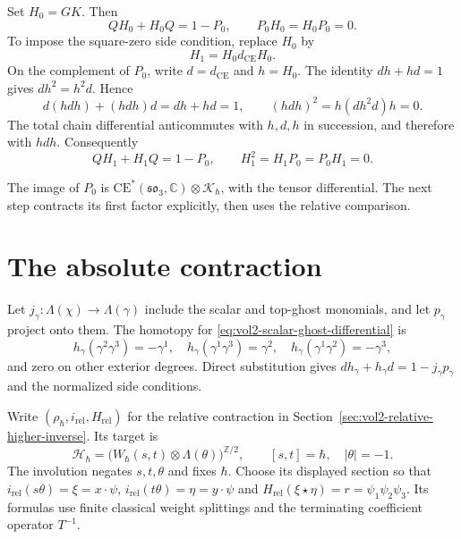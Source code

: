 Set $H_0=GK$. Then
\[
 QH_0+H_0Q=1-P_0,\qquad
 P_0H_0=H_0P_0=0.
\]
To impose the square-zero side condition, replace $H_0$ by
\begin{equation}\label{eq:vol2-absolute-normalized-casimir}
 H_1=H_0d_{\mathrm{CE}}H_0.
\end{equation}
On the complement of $P_0$, write $d=d_{\mathrm{CE}}$ and
$h=H_0$. The identity $dh+hd=1$ gives
$dh^2=h^2d$. Hence
\[
 d(hdh)+(hdh)d=dh+hd=1,
 \qquad (hdh)^2=h(dh^2d)h=0.
\]
The total chain differential anticommutes with $h,d,h$ in
succession, and therefore with $hdh$.
Consequently
\begin{equation}\label{eq:vol2-absolute-first-contraction}
 QH_1+H_1Q=1-P_0,
 \qquad H_1^2=H_1P_0=P_0H_1=0.
\end{equation}

The image of $P_0$ is
$\mathrm{CE}^*(\mathfrak{so}_3,\mathbb C)
 \otimes\mathcal K_\hbar$,
with the tensor differential. The next step contracts its
first factor explicitly, then uses the relative comparison.

\section{The absolute contraction}
\label{sec:vol2-absolute-contraction}

Let $j_\gamma:\Lambda(\chi)\to\Lambda(\gamma)$ include
the scalar and top-ghost monomials, and let $p_\gamma$ project
onto them. The homotopy for
\eqref{eq:vol2-scalar-ghost-differential} is
\begin{equation}\label{eq:vol2-absolute-scalar-homotopy}
 h_\gamma(\gamma^2\gamma^3)=-\gamma^1,
 \quad h_\gamma(\gamma^1\gamma^3)=\gamma^2,
 \quad h_\gamma(\gamma^1\gamma^2)=-\gamma^3,
\end{equation}
and zero on other exterior degrees. Direct substitution gives
$dh_\gamma+h_\gamma d=1-j_\gamma p_\gamma$ and the
normalized side conditions.

Write $(\rho_\hbar,i_{\mathrm{rel}},H_{\mathrm{rel}})$
for the relative contraction in
Section~\ref{sec:vol2-relative-higher-inverse}.
Its target is
\[
 \mathcal H_\hbar
  =\bigl(W_\hbar(s,t)\otimes\Lambda(\theta)\bigr)^{\mathbb Z/2},
 \qquad [s,t]=\hbar,\quad |\theta|=-1.
\]
The involution negates $s,t,\theta$ and fixes $\hbar$.
Choose its displayed section so that
$i_{\mathrm{rel}}(s\theta)=\xi=x\cdot\psi$,
$i_{\mathrm{rel}}(t\theta)=\eta=y\cdot\psi$ and
$H_{\mathrm{rel}}(\xi\star\eta)=r=\psi_1\psi_2\psi_3$.
Its formulas use finite classical weight splittings and the
terminating coefficient operator $T^{-1}$.

